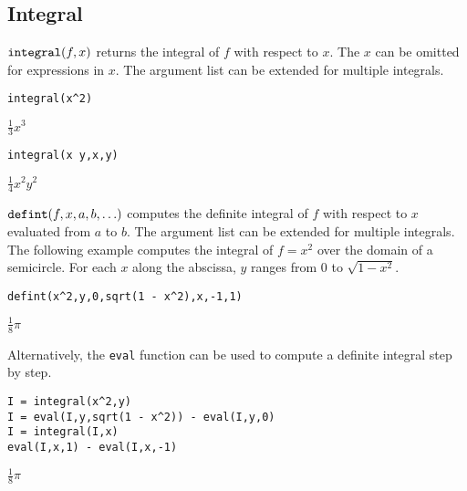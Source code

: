 \subsection{Integral}

$\text{\tt integral}(f,x)$ returns the integral of $f$ with respect to $x$.
The $x$ can be omitted for expressions in $x$.
The argument list can be extended for multiple integrals.

{\color{blue}
\begin{verbatim}
integral(x^2)
\end{verbatim}
}

\noindent
$\displaystyle \tfrac{1}{3}x^3$

{\color{blue}
\begin{verbatim}
integral(x y,x,y)
\end{verbatim}
}

\noindent
$\displaystyle \tfrac{1}{4}x^2y^2$

\bigskip
\noindent
$\text{\tt defint}(f,x,a,b,\ldots)$
computes the definite integral of $f$ with respect to $x$ evaluated from
$a$ to $b$.
The argument list can be extended for multiple integrals.
The following example computes the integral of $f=x^2$
over the domain of a semicircle.
For each $x$ along the abscissa, $y$ ranges from 0 to $\sqrt{1-x^2}$.

{\color{blue}
\begin{verbatim}
defint(x^2,y,0,sqrt(1 - x^2),x,-1,1)
\end{verbatim}
}

\noindent
$\displaystyle \tfrac{1}{8}\pi$

\bigskip
\noindent
Alternatively, the \verb$eval$ function can be used to compute a definite integral step by step.

{\color{blue}
\begin{verbatim}
I = integral(x^2,y)
I = eval(I,y,sqrt(1 - x^2)) - eval(I,y,0)
I = integral(I,x)
eval(I,x,1) - eval(I,x,-1)
\end{verbatim}
}

\noindent
$\displaystyle \tfrac{1}{8}\pi$
